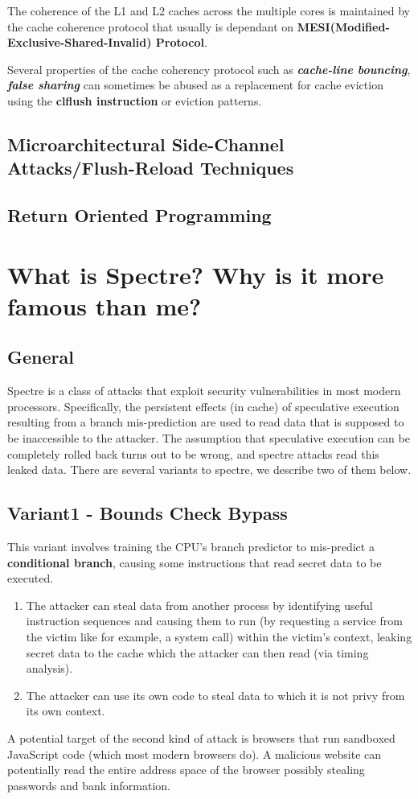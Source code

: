 \documentclass[12pt]{article}
\begin{document}
The coherence of the L1 and L2 caches across the multiple cores is maintained by the cache coherence protocol that usually is dependant on \textbf{MESI(Modified-Exclusive-Shared-Invalid) Protocol}.

Several properties of the cache coherency protocol such as \textbf{\textit{cache-line bouncing}}, \textbf{\textit{false sharing}} can sometimes be abused as a replacement for cache eviction using the \textbf{clflush instruction} or eviction patterns.
\subsection{Microarchitectural Side-Channel Attacks/Flush-Reload Techniques}

\subsection{Return Oriented Programming}
\section{What is Spectre? Why is it more famous than me?}
\subsection{General}
Spectre is a class of attacks that exploit security vulnerabilities in most modern processors. Specifically, the persistent effects (in cache) of speculative execution resulting from a branch mis-prediction are used to read data that is supposed to be inaccessible to the attacker. The assumption that speculative execution can be completely rolled back turns out to be wrong, and spectre attacks read this leaked data. There are several variants to spectre, we describe two of them below.
\subsection{Variant1 - Bounds Check Bypass}
This variant involves training the CPU's branch predictor to mis-predict a \textbf{conditional branch}, causing some instructions that read secret data to be executed. 
\begin{enumerate}
    \item The attacker can steal data from another process by identifying useful instruction sequences and causing them to run (by requesting a service from the victim like for example, a system call) within the victim's context, leaking secret data to the cache which the attacker can then read (via timing analysis). \item The attacker can use its own code to steal data to which it is not privy from its own context.
\end{enumerate}
 A potential target of the second kind of attack is browsers that run sandboxed JavaScript code (which most modern browsers do). A malicious website can potentially read the entire address space of the browser possibly stealing passwords and bank information.
\end{document}
